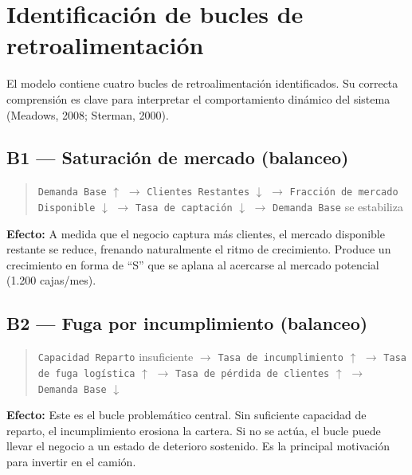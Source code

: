 \documentclass[10pt,a4paper]{article}
\begin{document}
\newpage

\section{Identificación de bucles de retroalimentación}

El modelo contiene cuatro bucles de retroalimentación identificados. Su correcta comprensión es clave para interpretar el comportamiento dinámico del sistema (Meadows, 2008; Sterman, 2000).

\subsection{B1 --- Saturación de mercado \textnormal{(balanceo)}}

\begin{quote}
\texttt{Demanda Base} $\uparrow$ $\rightarrow$ \texttt{Clientes Restantes} $\downarrow$ $\rightarrow$ \texttt{Fracción de mercado Disponible} $\downarrow$ $\rightarrow$ \texttt{Tasa de captación} $\downarrow$ $\rightarrow$ \texttt{Demanda Base} se estabiliza
\end{quote}

\textbf{Efecto:} A medida que el negocio captura más clientes, el mercado disponible restante se reduce, frenando naturalmente el ritmo de crecimiento. Produce un crecimiento en forma de ``S'' que se aplana al acercarse al mercado potencial (1.200 cajas/mes).

\subsection{B2 --- Fuga por incumplimiento \textnormal{(balanceo)}}

\begin{quote}
\texttt{Capacidad Reparto} insuficiente $\rightarrow$ \texttt{Tasa de incumplimiento} $\uparrow$ $\rightarrow$ \texttt{Tasa de fuga logística} $\uparrow$ $\rightarrow$ \texttt{Tasa de pérdida de clientes} $\uparrow$ $\rightarrow$ \texttt{Demanda Base} $\downarrow$
\end{quote}

\textbf{Efecto:} Este es el bucle problemático central. Sin suficiente capacidad de reparto, el incumplimiento erosiona la cartera. Si no se actúa, el bucle puede llevar el negocio a un estado de deterioro sostenido. Es la principal motivación para invertir en el camión.
\end{document}
